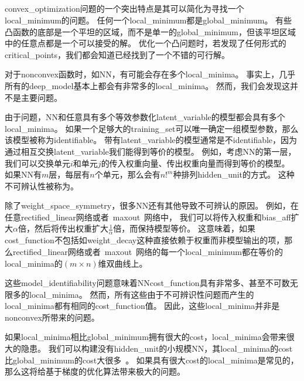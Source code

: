 \subsection{}
\label{sec:local_minima}
\gls{convex_optimization}问题的一个突出特点是其可以简化为寻找一个\gls{local_minimum}的问题。
任何一个\gls{local_minimum}都是\gls{global_minimum}。
有些凸函数的底部是一个平坦的区域，而不是单一的\gls{global_minimum}，但该平坦区域中的任意点都是一个可以接受的解。
优化一个凸问题时，若发现了任何形式的\gls{critical_points}，我们都会知道已经找到了一个不错的可行解。


对于\gls{nonconvex}函数时，如\gls{NN}，有可能会存在多个\gls{local_minima}。
事实上，几乎所有的\gls{deep_model}基本上都会有非常多的\gls{local_minima}。
然而，我们会发现这并不是主要问题。


由于问题，\gls{NN}和任意具有多个等效参数化\gls{latent_variable}的模型都会具有多个\gls{local_minima}。
如果一个足够大的\gls{training_set}可以唯一确定一组模型参数，那么该模型被称为\gls{identifiable}。
带有\gls{latent_variable}的模型通常是不\gls{identifiable}，因为通过相互交换\gls{latent_variable}我们能得到等价的模型。
例如，考虑\gls{NN}的第一层，我们可以交换单元$i$和单元$j$的传入权重向量、传出权重向量而得到等价的模型。
如果\gls{NN}有$m$层，每层有$n$个单元，那么会有$n!^m$种排列\gls{hidden_unit}的方式。
这种不可辨认性被称为。


除了\gls{weight_space_symmetry}，很多\gls{NN}还有其他导致不可辨认的原因。
例如，在任意\gls{rectified_linear}网络或者~\gls{maxout}~网络中，
我们可以将传入权重和\gls{bias_aff}扩大$\alpha$倍，然后将传出权重扩大$\frac{1}{\alpha}$倍，而保持模型等价。
这意味着，如果\gls{cost_function}不包括如\gls{weight_decay}这种直接依赖于权重而非模型输出的项，那么\gls{rectified_linear}网络或者~\gls{maxout}~网络的每一个\gls{local_minimum}都在等价的\gls{local_minima}的$(m\times n)$维双曲线上。


这些\gls{model_identifiability}问题意味着\gls{NN}\gls{cost_function}具有非常多、甚至不可数无限多的\gls{local_minima}。
然而，所有这些由于不可辨识性问题而产生的\gls{local_minima}都有相同的\gls{cost_function}值。
因此，这些\gls{local_minima}并非是\gls{nonconvex}所带来的问题。


如果\gls{local_minima}相比\gls{global_minimum}拥有很大的\gls{cost}，\gls{local_minima}会带来很大的隐患。
我们可以构建没有\gls{hidden_unit}的小规模\gls{NN}，其\gls{local_minima}的\gls{cost}比\gls{global_minimum}的\gls{cost}大很多~\citep{Sontag-cs89,Brady89,Gori-pami91}。
如果具有很大\gls{cost}的\gls{local_minima}是常见的，那么这将给基于梯度的优化算法带来极大的问题。


